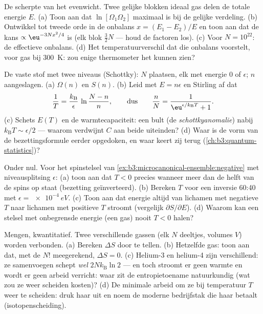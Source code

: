 \begin{exercise}[$\star\star$]\label{exo:b3:microcanonical-ensemble:7}
De scherpte van het evenwicht. Twee gelijke blokken ideaal gas delen de
totale energie $E$. (a) Toon aan dat $\ln[\Omega_1\Omega_2]$ maximaal is
bij de gelijke verdeling. (b) Ontwikkel tot tweede orde in de
onbalans $x =
(E_1 - E_2)/E$ en toon aan dat de kans $\propto\eu^{-3Nx^2/4}$
is (elk blok $\tfrac32 N$  --- houd de factoren los). (c)
Voor $N = 10^{22}$: de effectieve onbalans. (d) Het temperatuurverschil dat
die onbalans voorstelt, voor gas bij \qty{300}{K}: zou enige thermometer
het kunnen zien?
\end{exercise}

\begin{exercise}[$\star\star$]\label{exo:b3:microcanonical-ensemble:8}
De vaste stof met twee niveaus (Schottky): $N$ plaatsen, elk met energie
$0$ of $\epsilon$; $n$ aangeslagen. (a) $\Omega(n)$ en $S(n)$. (b) Leid met
$E =
n\epsilon$ en Stirling af dat
\[
\frac1T = \frac{k_{\text{B}}}{\epsilon}\,
\ln\frac{N - n}{n} ,
\qquad\text{dus}\qquad
\frac nN = \frac{1}{\eu^{\epsilon/k_{\text{B}}T} + 1} .
\]
(c) Schets $E(T)$ en de warmtecapaciteit: een bult (de \emph{schottkyanomalie})
nabij $k_{\text{B}}T \sim \epsilon/2$ --- waarom verdwijnt $C$ aan beide
uiteinden? (d) Waar is de vorm van de bezettingsformule eerder opgedoken,
en waar keert zij terug (\cref{ch:b3:quantum-statistics})?
\end{exercise}

\begin{exercise}[$\star\star$]\label{exo:b3:microcanonical-ensemble:9}
Onder nul. Voor het spinstelsel van
\cref{ex:b3:microcanonical-ensemble:negative} met niveausplitsing
$\epsilon$: (a) toon aan dat $T < 0$ precies wanneer meer dan de helft van
de spins op staat (bezetting geïnverteerd). (b) Bereken $T$ voor een
inversie 60:40 met $\epsilon = \qty{e-4}{eV}$. (c) Toon aan dat energie
altijd van lichamen met negatieve $T$ naar lichamen met positieve $T$
stroomt (vergelijk $\partial
S/\partial E$). (d) Waarom kan een stelsel met
onbegrensde energie (een gas) nooit $T < 0$ halen?
\end{exercise}

\begin{exercise}[$\star\star\star$]\label{exo:b3:microcanonical-ensemble:10}
Mengen, kwantitatief. Twee verschillende gassen (elk $N$ deeltjes,
volumes $V$) worden verbonden. (a) Bereken $\Delta S$ door te tellen. (b)
Hetzelfde gas: toon aan dat, met de $N!$ meegerekend, $\Delta S = 0$. (c)
Helium-3 en helium-4 zijn verschillend: ze samenvoegen schept \emph{wel}
$2Nk_{\text{B}}\ln2$ --- en toch stroomt er geen warmte en wordt er geen
arbeid verricht: waar zit de entropietoename natuurkundig (wat zou ze weer
scheiden kosten)? (d) De minimale arbeid om ze bij temperatuur $T$ weer te
scheiden: druk haar uit en noem de moderne bedrijfstak die haar betaalt
(isotopenscheiding).
\end{exercise}


